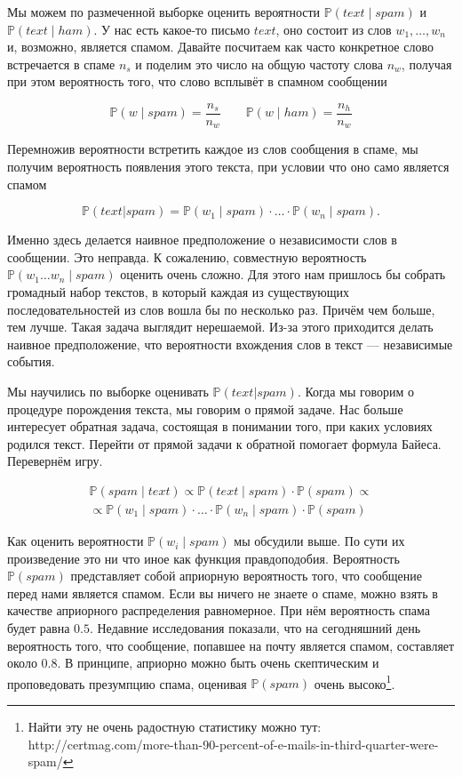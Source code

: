 \documentclass[12pt, a4paper, oneside]{extreport}
\def \mbb{\mathbb}
\def \PP{\mbb{P}}
\theoremstyle{plain}              %
\theoremstyle{definition}         %
\begin{document}
Мы можем по размеченной выборке оценить вероятности $\PP(text \mid spam)$ и $ \PP(text \mid ham) $.  У нас есть какое-то письмо $text$, оно состоит из слов $w_1, \ldots, w_n$ и, возможно, является спамом.  Давайте посчитаем как часто конкретное слово встречается в спаме  $n_s$ и поделим это число на общую частоту слова $n_w$, получая при этом вероятность того, что слово всплывёт в спамном сообщении

\[\PP(w \mid spam) = \frac{n_s}{n_w} \qquad  \PP(w \mid ham) = \frac{n_h}{n_w} \]

Перемножив вероятности встретить каждое из слов сообщения в спаме, мы получим вероятность появления этого текста, при условии что оно само является спамом

\[ \PP(text | spam ) = \PP(w_1 \mid spam) \cdot \ldots \cdot \PP(w_n \mid spam).\]

Именно здесь делается наивное предположение о независимости слов в сообщении.  Это неправда. К сожалению, совместную вероятность $\PP(w_1 \ldots w_n \mid spam)$ оценить очень сложно. Для этого нам пришлось бы собрать громадный набор текстов, в который каждая из существующих последовательностей из слов вошла бы по несколько раз. Причём чем больше, тем лучше. Такая задача выглядит нерешаемой. Из-за этого приходится делать наивное предположение, что вероятности вхождения слов в текст --- независимые события. 

Мы научились по выборке оценивать  $ \PP(text | spam ) $.  Когда мы говорим о процедуре порождения текста, мы говорим о прямой задаче. Нас больше интересует обратная задача, состоящая в понимании того, при каких условиях родился текст. Перейти от прямой задачи к обратной помогает формула Байеса. Перевернём игру. 

\begin{multline*}
\PP(spam \mid text)  \propto  \PP(text \mid spam) \cdot \PP(spam) \propto \\ \propto \PP(w_1 \mid spam) \cdot \ldots \cdot \PP(w_n \mid spam) \cdot \PP(spam)
\end{multline*}

Как оценить вероятности $\PP(w_i \mid spam)$ мы обсудили выше. По сути их произведение это ни что иное как функция правдоподобия.  Вероятность $\PP(spam)$ представляет собой априорную вероятность того, что сообщение перед нами является спамом. Если вы ничего не знаете о спаме, можно взять в качестве априорного распределения равномерное. При нём вероятность спама будет равна $0.5$.  Недавние исследования показали, что на сегодняшний день вероятность того, что сообщение, попавшее на почту является спамом, составляет около $0.8$. В принципе, априорно можно быть очень скептическим и проповедовать презумпцию спама, оценивая $\PP(spam)$ очень высоко\footnote{Найти эту не очень радостную статистику можно тут: http://certmag.com/more-than-90-percent-of-e-mails-in-third-quarter-were-spam/}. 
\end{document}

